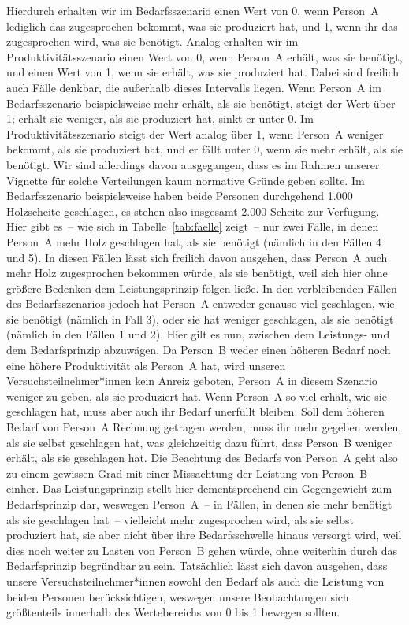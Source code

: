 \documentclass[justified,nobib,nohyper,symmetric,twoside]{tufte-book}
\begin{document}
Hierdurch erhalten wir im Bedarfsszenario einen Wert von 0, wenn Person~A lediglich das zugesprochen bekommt, was sie produziert hat, und 1, wenn ihr das zugesprochen wird, was sie benötigt.
Analog erhalten wir im Produktivitätsszenario einen Wert von 0, wenn Person~A erhält, was sie benötigt, und einen Wert von 1, wenn sie erhält, was sie produziert hat.
Dabei sind freilich auch Fälle denkbar, die außerhalb dieses Intervalls liegen.
Wenn Person~A im Bedarfsszenario beispielsweise mehr erhält, als sie benötigt, steigt der Wert über 1; erhält sie weniger, als sie produziert hat, sinkt er unter 0.
Im Produktivitätsszenario steigt der Wert analog über 1, wenn Person~A weniger bekommt, als sie produziert hat, und er fällt unter 0, wenn sie mehr erhält, als sie benötigt.
Wir sind allerdings davon ausgegangen, dass es im Rahmen unserer Vignette für solche Verteilungen kaum normative Gründe geben sollte.
Im Bedarfsszenario beispielsweise haben beide Personen durchgehend 1.000 Holzscheite geschlagen, es stehen also insgesamt 2.000 Scheite zur Verfügung.
Hier gibt es~-- wie sich in Tabelle~\ref{tab:faelle} zeigt~-- nur zwei Fälle, in denen Person~A mehr Holz geschlagen hat, als sie benötigt (nämlich in den Fällen 4 und 5).
In diesen Fällen lässt sich freilich davon ausgehen, dass Person~A auch mehr Holz zugesprochen bekommen würde, als sie benötigt, weil sich hier ohne größere Bedenken dem Leistungsprinzip folgen ließe.
In den verbleibenden Fällen des Bedarfsszenarios jedoch hat Person~A entweder genauso viel geschlagen, wie sie benötigt (nämlich in Fall 3), oder sie hat weniger geschlagen, als sie benötigt (nämlich in den Fällen 1 und 2).
Hier gilt es nun, zwischen dem Leistungs- und dem Bedarfsprinzip abzuwägen.
Da Person~B weder einen höheren Bedarf noch eine höhere Produktivität als Person~A hat, wird unseren Versuchsteilnehmer*innen kein Anreiz geboten, Person~A in diesem Szenario weniger zu geben, als sie produziert hat.
Wenn Person~A so viel erhält, wie sie geschlagen hat, muss aber auch ihr Bedarf unerfüllt bleiben.
Soll dem höheren Bedarf von Person~A Rechnung getragen werden, muss ihr mehr gegeben werden, als sie selbst geschlagen hat, was gleichzeitig dazu führt, dass Person~B weniger erhält, als sie geschlagen hat.
Die Beachtung des Bedarfs von Person~A geht also zu einem gewissen Grad mit einer Missachtung der Leistung von Person~B einher.
Das Leistungsprinzip stellt hier dementsprechend ein Gegengewicht zum Bedarfsprinzip dar, weswegen Person~A~-- in Fällen, in denen sie mehr benötigt als sie geschlagen hat~-- vielleicht mehr zugesprochen wird, als sie selbst produziert hat, sie aber nicht über ihre Bedarfsschwelle hinaus versorgt wird, weil dies noch weiter zu Lasten von Person~B gehen würde, ohne weiterhin durch das Bedarfsprinzip begründbar zu sein.
Tatsächlich lässt sich davon ausgehen, dass unsere Versuchsteilnehmer*innen sowohl den Bedarf als auch die Leistung von beiden Personen berücksichtigen, weswegen unsere Beobachtungen sich größtenteils innerhalb des Wertebereichs von 0 bis 1 bewegen sollten.
\end{document}
